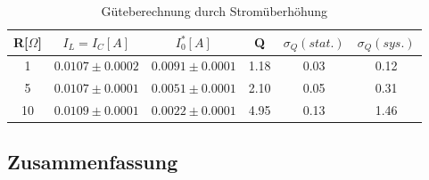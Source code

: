 \documentclass[12pt,a4paper]{article}
\begin{document}
\begin{table}[H]
	\centering
	\begin{tabular}{|c|c|c|c|c|c|}
		\hline
		R[$\Omega$]&$I_L=I_C[A]$&$I_0^*[A]$&Q&$\sigma_Q(stat.)$&$\sigma_Q(sys.)$\\
		\hline
		1&$0.0107\pm0.0002$&$0.0091\pm0.0001$&1.18&0.03&0.12\\
		5&$0.0107\pm0.0001$&$0.0051\pm0.0001$&2.10&0.05&0.31\\
		10&$0.0109\pm0.0001$&$0.0022\pm0.0001$&4.95&0.13&1.46\\
		\hline		
	\end{tabular}
	\caption{Güteberechnung durch Stromüberhöhung}
	\label{table:P_I}
\end{table}







\subsection{Zusammenfassung}
\end{document}

